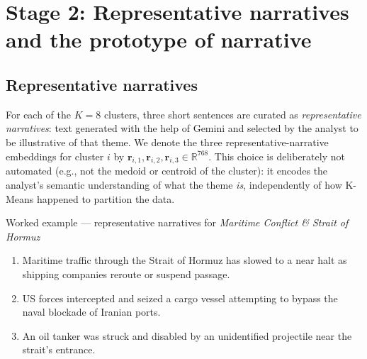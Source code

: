 \documentclass[11pt]{article}
\begin{document}
\section{Stage 2: Representative narratives and the prototype of narrative}

\subsection{Representative narratives}
For each of the $K=8$ clusters, three short sentences are curated as
\emph{representative narratives}: text generated with the help of Gemini and
selected by the analyst to be illustrative of that theme. We denote the
three representative-narrative embeddings for cluster $i$ by
$\mathbf{r}_{i,1}, \mathbf{r}_{i,2}, \mathbf{r}_{i,3} \in \mathbb{R}^{768}$.
This choice is deliberately not automated (e.g., not the medoid or centroid
of the cluster): it encodes the analyst's semantic understanding of what the
theme \emph{is}, independently of how K-Means happened to partition the
data.

\begin{examplebox}{Worked example --- representative narratives for \textit{Maritime Conflict \& Strait of Hormuz}}
\begin{enumerate}[label=$\mathbf{r}_{7,\arabic*}$:, leftmargin=1.5cm]
\item Maritime traffic through the Strait of Hormuz has slowed to a near halt as shipping companies reroute or suspend passage.
\item US forces intercepted and seized a cargo vessel attempting to bypass the naval blockade of Iranian ports.
\item An oil tanker was struck and disabled by an unidentified projectile near the strait's entrance.
\end{enumerate}
\end{examplebox}
\end{document}
